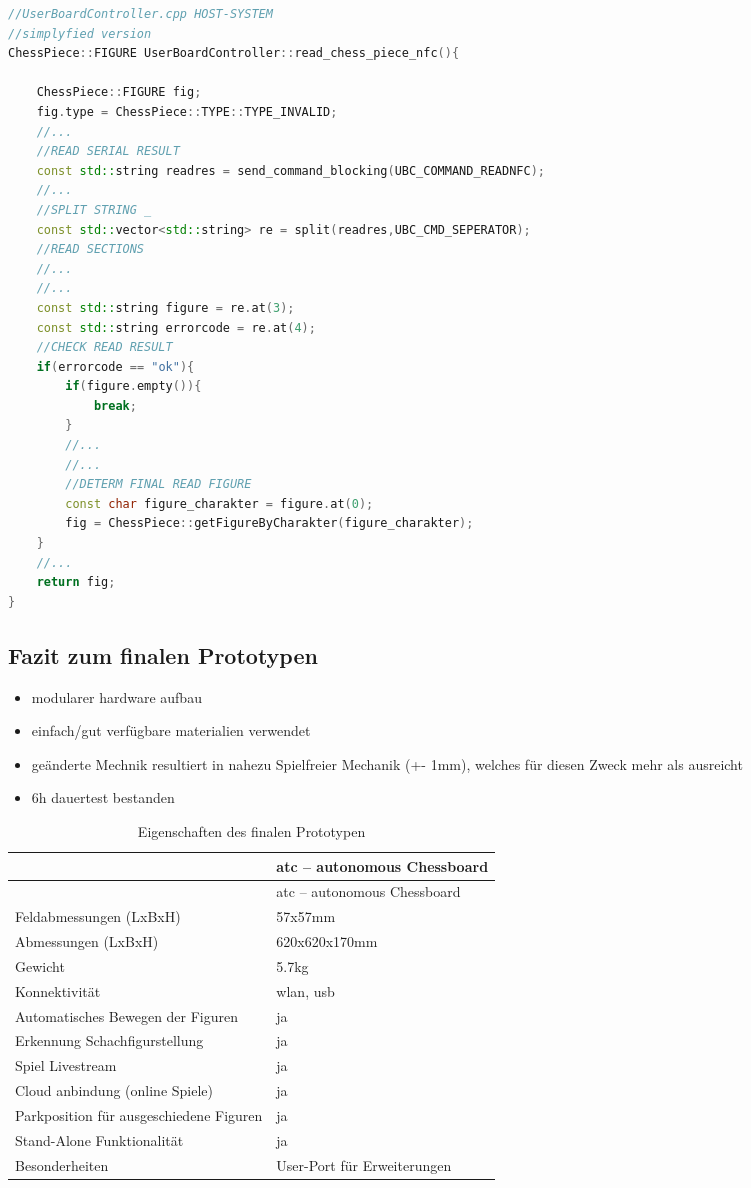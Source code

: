 \begin{lstlisting}[language={C++}]
//UserBoardController.cpp HOST-SYSTEM
//simplyfied version
ChessPiece::FIGURE UserBoardController::read_chess_piece_nfc(){

    ChessPiece::FIGURE fig;
    fig.type = ChessPiece::TYPE::TYPE_INVALID;
    //...
    //READ SERIAL RESULT
    const std::string readres = send_command_blocking(UBC_COMMAND_READNFC);
    //...
    //SPLIT STRING _
    const std::vector<std::string> re = split(readres,UBC_CMD_SEPERATOR);
    //READ SECTIONS
    //...
    //...
    const std::string figure = re.at(3);
    const std::string errorcode = re.at(4);
    //CHECK READ RESULT
    if(errorcode == "ok"){
        if(figure.empty()){
            break;
        }
        //...
        //...
        //DETERM FINAL READ FIGURE
        const char figure_charakter = figure.at(0);
        fig = ChessPiece::getFigureByCharakter(figure_charakter);
    }
    //...
    return fig;
}
\end{lstlisting}

\hypertarget{fazit-zum-finalen-prototypen}{%
\subsection{Fazit zum finalen
Prototypen}\label{fazit-zum-finalen-prototypen}}

\begin{itemize}
\tightlist
\item
  modularer hardware aufbau
\item
  einfach/gut verfügbare materialien verwendet
\item
  geänderte Mechnik resultiert in nahezu Spielfreier Mechanik (+- 1mm),
  welches für diesen Zweck mehr als ausreicht
\item
  6h dauertest bestanden
\end{itemize}

\begin{longtable}[]{@{}ll@{}}
\caption{Eigenschaften des finalen Prototypen}\tabularnewline
\toprule
& \gls{atc} -- autonomous Chessboard\tabularnewline
\midrule
\endfirsthead
\toprule
& \gls{atc} -- autonomous Chessboard\tabularnewline
\midrule
\endhead
Feldabmessungen (LxBxH) & 57x57mm\tabularnewline
Abmessungen (LxBxH) & 620x620x170mm\tabularnewline
Gewicht & 5.7kg\tabularnewline
Konnektivität & \gls{wlan}, \gls{usb}\tabularnewline
Automatisches Bewegen der Figuren & ja\tabularnewline
Erkennung Schachfigurstellung & ja\tabularnewline
Spiel Livestream & ja\tabularnewline
Cloud anbindung (online Spiele) & ja\tabularnewline
Parkposition für ausgeschiedene Figuren & ja\tabularnewline
Stand-Alone Funktionalität & ja\tabularnewline
Besonderheiten & User-Port für Erweiterungen\tabularnewline
\bottomrule
\end{longtable}

